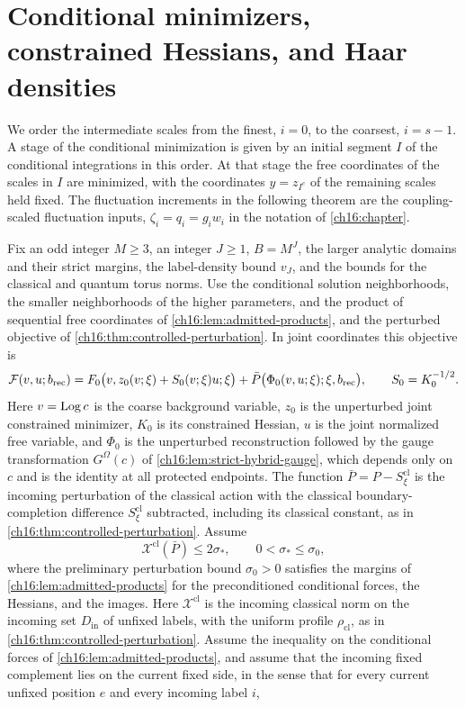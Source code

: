 \section{Conditional minimizers, constrained Hessians, and Haar densities}\label{ch17:sec:hessians}

We order the intermediate scales from the finest, $i=0$, to the coarsest, $i=s-1$. A stage of the conditional minimization is given by an initial segment $I$ of the conditional integrations in this order. At that stage the free coordinates of the scales in $I$ are minimized, with the coordinates $y=z_{I^c}$ of the remaining scales held fixed. The fluctuation increments in the following theorem are the coupling-scaled fluctuation inputs, $\zeta_i=q_i=g_iw_i$ in the notation of \cref{ch16:chapter}.

\begin{theorem}\label{ch17:thm:perturbed-hessian-coarea}
Fix an odd integer $M\ge3$, an integer $J\ge1$, $B=M^J$, the larger analytic domains and their strict margins, the label-density bound $v_J$, and the bounds for the classical and quantum torus norms. Use the conditional solution neighborhoods, the smaller neighborhoods of the higher parameters, and the product of sequential free coordinates of \cref{ch16:lem:admitted-products}, and the perturbed objective of \cref{ch16:thm:controlled-perturbation}. In joint coordinates this objective is
\begin{equation}\label{ch17:eq:objective}
 \mathcal F(v,u;b_{\mathrm{rec}})=F_0\bigl(v,z_0(v;\xi)+S_0(v;\xi)u;\xi\bigr)+\bar P\bigl(\Phi_0(v,u;\xi);\xi,b_{\mathrm{rec}}\bigr),\qquad S_0=K_0^{-1/2}.
\end{equation}
Here $v=\operatorname{Log} c$ is the coarse background variable, $z_0$ is the unperturbed joint constrained minimizer, $K_0$ is its constrained Hessian, $u$ is the joint normalized free variable, and $\Phi_0$ is the unperturbed reconstruction followed by the gauge transformation $G^\Omega(c)$ of \cref{ch16:lem:strict-hybrid-gauge}, which depends only on $c$ and is the identity at all protected endpoints. The function $\bar P=P-S^{\mathrm{cl}}_\xi$ is the incoming perturbation of the classical action with the classical boundary-completion difference $S^{\mathrm{cl}}_\xi$ subtracted, including its classical constant, as in \cref{ch16:thm:controlled-perturbation}. Assume
\[
 \mathcal X^{\mathrm{cl}}(\bar P)\le2\sigma_*,\qquad0<\sigma_*\le\sigma_0,
\]
where the preliminary perturbation bound $\sigma_0>0$ satisfies the margins of \cref{ch16:lem:admitted-products} for the preconditioned conditional forces, the Hessians, and the images. Here $\mathcal X^{\mathrm{cl}}$ is the incoming classical norm on the incoming set $D_{\mathrm{in}}$ of unfixed labels, with the uniform profile $\rho_{\mathrm{cl}}$, as in \cref{ch16:thm:controlled-perturbation}. Assume the inequality on the conditional forces of \cref{ch16:lem:admitted-products}, and assume that the incoming fixed complement lies on the current fixed side, in the sense that for every current unfixed position $e$ and every incoming label $i$,

\end{theorem}
